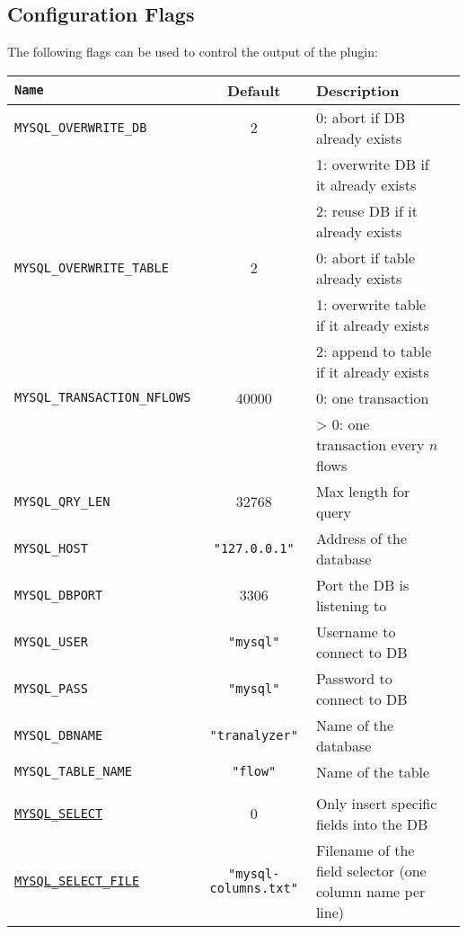 \documentclass[documentation]{subfiles}
\begin{document}
\subsection{Configuration Flags}
The following flags can be used to control the output of the plugin:
\begin{longtable}{>{\tt}lcl>{\tt\small}l}
    \toprule
    {\bf Name} & {\bf Default} & {\bf Description}\\
    \midrule\endhead%
    MYSQL\_OVERWRITE\_DB       & 2                        & 0: abort if DB already exists\\
                               &                          & 1: overwrite DB if it already exists\\
                               &                          & 2: reuse DB if it already exists\\
    MYSQL\_OVERWRITE\_TABLE    & 2                        & 0: abort if table already exists\\
                               &                          & 1: overwrite table if it already exists\\
                               &                          & 2: append to table if it already exists\\
    MYSQL\_TRANSACTION\_NFLOWS & 40000                    & 0: one transaction\\
                               &                          & > 0: one transaction every $n$ flows\\
    MYSQL\_QRY\_LEN            & 32768                    & Max length for query\\
    MYSQL\_HOST                & {\tt\small "127.0.0.1"}  & Address of the database\\
    MYSQL\_DBPORT              & 3306                     & Port the DB is listening to\\
    MYSQL\_USER                & {\tt\small "mysql"}      & Username to connect to DB\\
    MYSQL\_PASS                & {\tt\small "mysql"}      & Password to connect to DB\\
    MYSQL\_DBNAME              & {\tt\small "tranalyzer"} & Name of the database\\
    MYSQL\_TABLE\_NAME         & {\tt\small "flow"}       & Name of the table\\
    \\
    \hyperref[mysql:select]{MYSQL\_SELECT}
                               & 0                        & Only insert specific fields into the DB\\
    \hyperref[mysql:select]{MYSQL\_SELECT\_FILE}
                               & {\small\tt "mysql-columns.txt"}
                                                          & Filename of the field selector (one column name per line)\\
    \bottomrule
\end{longtable}
\end{document}
